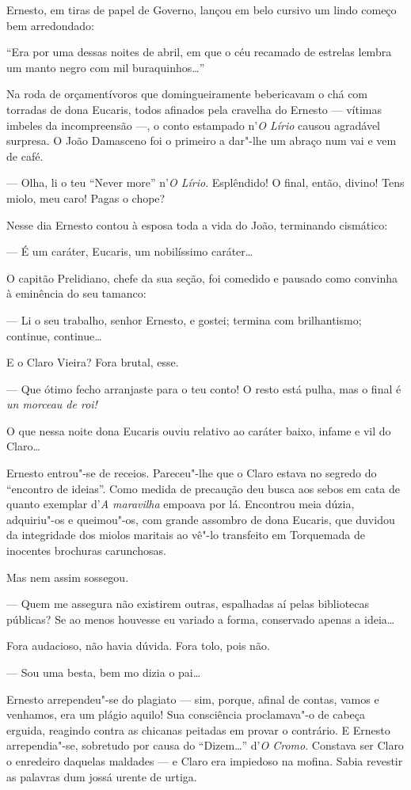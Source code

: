 Ernesto, em tiras de papel de Governo, lançou em belo cursivo um lindo
começo bem arredondado:

``Era por uma dessas noites de abril, em que o céu recamado de estrelas
lembra um manto negro com mil buraquinhos\ldots{}''

Na roda de orçamentívoros que domingueiramente bebericavam o chá com
torradas de dona Eucaris, todos afinados pela cravelha do Ernesto ---
vítimas imbeles da incompreensão ---, o conto estampado n'\emph{O Lírio}
causou agradável surpresa. O João Damasceno foi o primeiro a dar"-lhe um
abraço num vai e vem de café.

--- Olha, li o teu ``Never more'' n'\emph{O Lírio}. Esplêndido! O final,
então, divino! Tens miolo, meu caro! Pagas o chope?

Nesse dia Ernesto contou à esposa toda a vida do João, terminando
cismático:

--- É um caráter, Eucaris, um nobilíssimo caráter\ldots{}

O capitão Prelidiano, chefe da sua seção, foi comedido e pausado como
convinha à eminência do seu tamanco:

--- Li o seu trabalho, senhor Ernesto, e gostei; termina com
brilhantismo; continue, continue\ldots{}

E o Claro Vieira? Fora brutal, esse.

--- Que ótimo fecho arranjaste para o teu conto! O resto está pulha, mas
o final é \emph{un morceau de roi!}

O que nessa noite dona Eucaris ouviu relativo ao caráter baixo, infame e
vil do Claro\ldots{}

Ernesto entrou"-se de receios. Pareceu"-lhe que o Claro estava no segredo
do ``encontro de ideias''. Como medida de precaução deu busca aos sebos
em cata de quanto exemplar d'\emph{A maravilha} empoava por lá.
Encontrou meia dúzia, adquiriu"-os e queimou"-os, com grande assombro de
dona Eucaris, que duvidou da integridade dos miolos maritais ao vê"-lo
transfeito em Torquemada de inocentes brochuras carunchosas.

Mas nem assim sossegou.

--- Quem me assegura não existirem outras, espalhadas aí pelas
bibliotecas públicas? Se ao menos houvesse eu variado a forma,
conservado apenas a ideia\ldots{}

Fora audacioso, não havia dúvida. Fora tolo, pois não.

--- Sou uma besta, bem mo dizia o pai\ldots{}

Ernesto arrependeu"-se do plagiato --- sim, porque, afinal de contas,
vamos e venhamos, era um plágio aquilo! Sua consciência proclamava"-o de
cabeça erguida, reagindo contra as chicanas peitadas em provar o
contrário. E Ernesto arrependia"-se, sobretudo por causa do ``Dizem\ldots{}''
d'\emph{O Cromo}. Constava ser Claro o enredeiro daquelas maldades --- e
Claro era impiedoso na mofina. Sabia revestir as palavras dum jossá
urente de urtiga.

